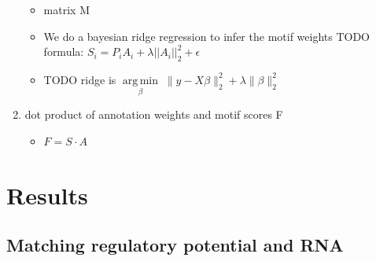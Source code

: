 \begin{enumerate}[label=(\Alph*)]
    \begin{itemize}
        \item matrix M
        \item We do a bayesian ridge regression to infer the motif weights TODO formula: $S_i = P_i A_i + \lambda ||A_i||_2^2 +\epsilon$
        \item TODO ridge is $ \underset{\beta}{\operatorname{arg\,min}}\; \|y - X\beta\|^2_2 + \lambda \|\beta\|^2_2 $
    \end{itemize}
    \item dot product of annotation weights and motif scores F
    \begin{itemize}
        \item $F = S \cdot A$
    \end{itemize}
\end{enumerate}

\section{Results}

\subsection{Matching regulatory potential and RNA}

